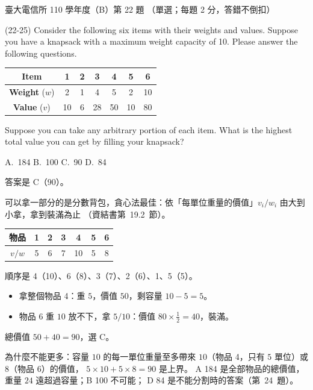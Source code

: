 \begin{pastexam}[label={px:ntu-110-comm-dsa-22}]{臺大電信所 110 學年度（B）第 22 題}
（單選；每題 2 分，答錯不倒扣）

(22-25) Consider the following six items with their weights and values. Suppose you have a knapsack with a maximum weight capacity of 10. Please answer the following questions.
\begin{center}
\begin{tabular}{|c|c|c|c|c|c|c|}
\hline
\textbf{Item} & \textbf{1} & \textbf{2} & \textbf{3} & \textbf{4} & \textbf{5} & \textbf{6}\\ \hline
\textbf{Weight} ($w$) & 2 & 1 & 4 & 5 & 2 & 10\\ \hline
\textbf{Value} ($v$) & 10 & 6 & 28 & 50 & 10 & 80\\ \hline
\end{tabular}
\end{center}

Suppose you can take any arbitrary portion of each item. What is the highest total value you can get by filling your knapsack?

A.~184 \qquad B.~100 \qquad C.~90 \qquad D.~84
\end{pastexam}

\begin{pastsoln}
答案是 C（90）。

可以拿一部分的是分數背包，貪心法最佳：依「每單位重量的價值」$v_i / w_i$ 由大到小拿，拿到裝滿為止
（資結書第~19.2~節）。
\begin{center}
\begin{tabular}{ccccccc}
\toprule
物品 & 1 & 2 & 3 & 4 & 5 & 6 \\
\midrule
$v/w$ & 5 & 6 & 7 & 10 & 5 & 8 \\
\bottomrule
\end{tabular}
\end{center}
順序是 4（10）、6（8）、3（7）、2（6）、1、5（5）。
\begin{itemize}
\item 拿整個物品 4：重 $5$，價值 $50$，剩容量 $10 - 5 = 5$。
\item 物品 6 重 $10$ 放不下，拿 $5/10$：價值 $80 \times \tfrac12 = 40$，裝滿。
\end{itemize}
總價值 $50 + 40 = 90$，選 C。

為什麼不能更多：容量 $10$ 的每一單位重量至多帶來 $10$（物品 4，只有 $5$ 單位）或 $8$（物品 6）的價值，
$5 \times 10 + 5 \times 8 = 90$ 是上界。 A 184 是全部物品的總價值，重量 $24$ 遠超過容量；B 100 不可能；
D 84 是不能分割時的答案（第~24~題）。
\end{pastsoln}
